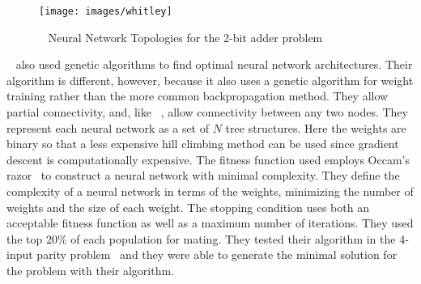 \begin{figure}[htb!]
  \centering
  \texttt{[image: images/whitley]}
  \caption{~\cite{whitley} Neural Network Topologies for the 2-bit
    adder problem}
  \label{whitley1}
\end{figure}  

~\cite{zhang} also used genetic algorithms to find optimal neural
network architectures. 
Their algorithm is different, however, because it also uses a genetic
algorithm for weight training rather than the more common
backpropagation method.
They allow partial connectivity, and, like ~\cite{whitley}, allow connectivity between any two nodes.
They represent each neural network as a set of $N$ tree structures.
Here the weights are binary so that a less expensive hill climbing
method can be used since gradient descent is computationally
expensive.
The fitness function used employs Occam's razor~\cite{occamsRazor} to construct a neural
network with minimal complexity.
They define the complexity of a neural network in terms of the
weights, minimizing the number of weights and the size of each weight.
The stopping condition uses both an acceptable fitness function as
well as a maximum number of iterations.
They used the top $20\%$ of each population for mating.
They tested their algorithm in the 4-input parity problem~\cite{4bit} and they
were able to generate the minimal solution for the problem with their
algorithm.










 

